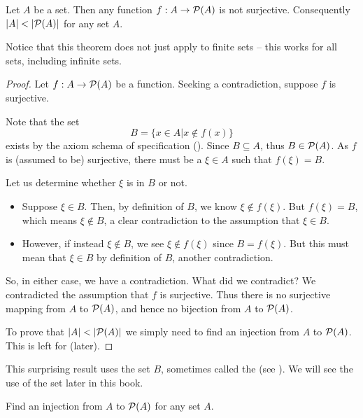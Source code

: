 \begin{theorem}[Cantor]\label{theorem:cantor}
    Let $A$ be a set. Then any function $f: A \to {\mathcal{P}(A)}$ is not surjective. Consequently $|A| < |{\mathcal{P}(A)}|$ for any set $A$.
\end{theorem}

Notice that this theorem does not just apply to finite sets -- this works for all sets, including infinite sets.

\begin{proof}
    Let $f: A \to {\mathcal{P}(A)}$ be a function. Seeking a contradiction, suppose $f$ is surjective.
    
    Note that the set
    \[
        B = \{x \in A \vert x \notin f(x)\}
    \]
    exists by the axiom schema of specification (). Since $B \subseteq A$, thus $B \in {\mathcal{P}(A)}$. As $f$ is (assumed to be) surjective, there must be a $\xi \in A$ such that $f(\xi) = B$.

    Let us determine whether $\xi$ is in $B$ or not.
    \begin{itemize}
        \item Suppose $\xi \in B$. Then, by definition of $B$, we know $\xi \notin f(\xi)$. But $f(\xi) = B$, which means $\xi \notin B$, a clear contradiction to the assumption that $\xi \in B$.
        \item However, if instead $\xi \notin B$, we see $\xi \notin f(\xi)$ since $B = f(\xi)$. But this must mean that $\xi \in B$ by definition of $B$, another contradiction.
    \end{itemize}
    So, in either case, we have a contradiction. What did we contradict? We contradicted the assumption that $f$ is surjective. Thus there is no surjective mapping from $A$ to ${\mathcal{P}(A)}$, and hence no bijection from $A$ to ${\mathcal{P}(A)}$.

    To prove that $|A| < |{\mathcal{P}(A)}|$ we simply need to find an injection from $A$ to ${\mathcal{P}(A)}$. This is left for  (later).
\end{proof}

This surprising result uses the set $B$, sometimes called the  (see \cite[Theorem 1210, p.~362]{dasgupta_2014}). We will see the use of the set later in this book.

\begin{exercise}\label{exercise:cantor-last-part}
    Find an injection from $A$ to ${\mathcal{P}(A)}$ for any set $A$.
\end{exercise}

